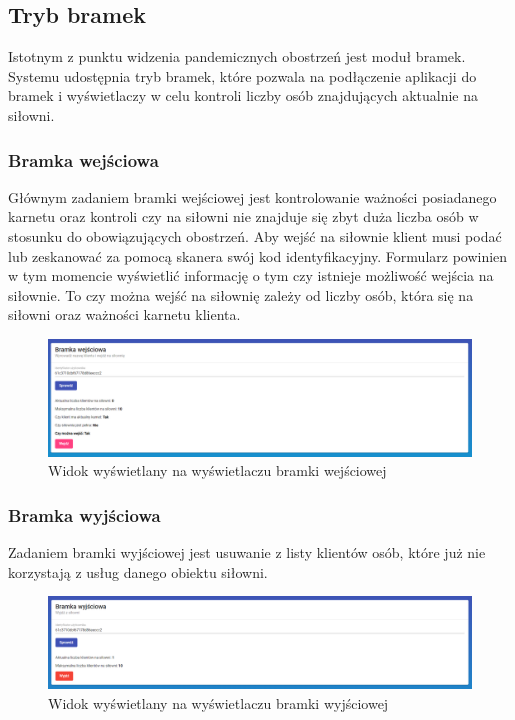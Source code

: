 \documentclass[a4paper,twoside,12pt]{book}
\begin{document}
\subsection{Tryb bramek}
Istotnym z punktu widzenia pandemicznych obostrzeń jest moduł bramek. Systemu udostępnia tryb bramek, które pozwala na podłączenie aplikacji do bramek i wyświetlaczy w celu kontroli liczby osób znajdujących aktualnie na siłowni.
\subsubsection{Bramka wejściowa}
Głównym zadaniem bramki wejściowej jest kontrolowanie ważności posiadanego karnetu oraz kontroli czy na siłowni nie znajduje się zbyt duża liczba osób w stosunku do obowiązujących obostrzeń. Aby wejść na siłownie klient musi podać lub zeskanować za pomocą skanera swój kod identyfikacyjny. Formularz powinien w tym momencie wyświetlić informację o tym czy istnieje możliwość wejścia na siłownie. To czy można wejść na siłownię zależy od liczby osób, która się na siłowni oraz ważności karnetu klienta.
\begin{figure}[H]
	\centering
	\includegraphics[width=1\linewidth]{../zrzuty_ekranu/dzialanie/bramki/bramka_wejsciowa}
	\caption{Widok wyświetlany na wyświetlaczu bramki wejściowej}
	\label{fig:bramkawejsciowa}
\end{figure}

\subsubsection{Bramka wyjściowa}
Zadaniem bramki wyjściowej jest usuwanie z listy klientów osób, które już nie korzystają z usług danego obiektu siłowni.
\begin{figure}[H]
	\centering
	\includegraphics[width=1\linewidth]{../zrzuty_ekranu/dzialanie/bramki/bramka_wyjsciowa}
	\caption{Widok wyświetlany na wyświetlaczu bramki wyjściowej}
	\label{fig:bramkawyjsciowa}
\end{figure}
\end{document}
